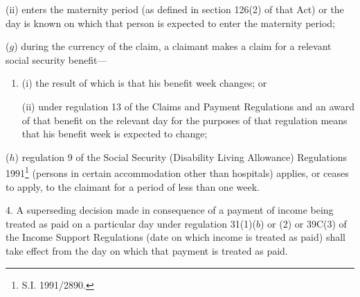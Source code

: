 \documentclass[12pt,a4paper]{article}
\begin{document}
\begin{enumerate}
\begin{enumerate}
(ii) enters the maternity period (as defined in section 126(2) of that Act) or the day is known on which that person is expected to enter the maternity period;
\end{enumerate}

($g$) during the currency of the claim, a claimant makes a claim for a relevant social security benefit—
\begin{enumerate}\item[]
(i) the result of which is that his benefit week changes; or

(ii) under regulation 13 of the Claims and Payment Regulations and an award of that benefit on the relevant day for the purposes of that regulation means that his benefit week is expected to change;
\end{enumerate}

($h$) regulation 9 of the Social Security (Disability Living Allowance) Regulations 1991\footnote{S.I. 1991/2890.} (persons in certain accommodation other than hospitals) applies, or ceases to apply, to the claimant for a period of less than one week.
\end{enumerate}


\medskip

4.  A superseding decision made in consequence of a payment of income being treated as paid on a particular day under regulation 31(1)($b$)  or (2) or 39C(3) of the Income Support Regulations (date on which income is treated as paid) shall take effect from the day on which that payment is treated as paid.

\medskip
\end{document}
